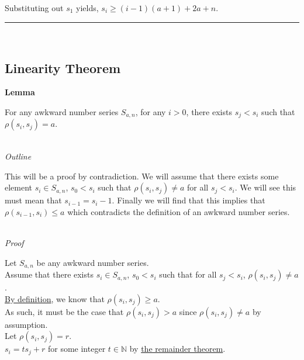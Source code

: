 \documentclass[a4paper,12pt]{article}
\begin{document}
\noindent Substituting out $s_1$ yields, $s_i \geq (i - 1)(a + 1) + 2a + n$.


\begin{center}
\noindent\rule{8cm}{0.4pt}
\end{center}
\noindent \\


\subsection{Linearity Theorem}



\label{lemma:relation_to_other}
\hypertarget{lemma:relation_to_other}{}
\begin{tcolorbox}
\textbf{Lemma}

For any awkward number series $S_{a,n}$, for any $i > 0$, there exists $s_j < s_i$ such that $\rho(s_i, s_j) = a$.

\end{tcolorbox}

\noindent \\
\textit{Outline}

\noindent This will be a proof by contradiction. We will assume that there exists some element $s_i \in S_{a,n}$, $s_0 < s_i$ such that $\rho(s_i, s_j) \neq a$ for all $s_j < s_i$. We will see this must mean that $s_{i - 1} = s_i - 1$. Finally we will find that this implies that $\rho(s_{i - 1}, s_i) \leq a$ which contradicts the definition of an awkward number series.

\noindent \\
\textit{Proof}

\noindent Let $S_{a, n}$ be any awkward number series.\\

\noindent Assume that there exists $s_i \in S_{a, n}$, $s_0 < s_i$ such that for all $s_j < s_i$, $\rho(s_i, s_j) \neq a$.\\

\noindent \hyperlink{definition:awkward_number_series}{By definition}, we know that $\rho(s_i, s_j) \geq a$.\\

\noindent As such, it must be the case that $\rho(s_i, s_j) > a$ since $\rho(s_i, s_j) \neq a$ by assumption.\\

\noindent Let $\rho(s_i, s_j) = r$.\\

\noindent $s_i = ts_j + r$ for some integer $t \in \mathbb{N}$ by \hyperlink{theorem:remainder_theorem}{the remainder theorem}.\\
\end{document}
